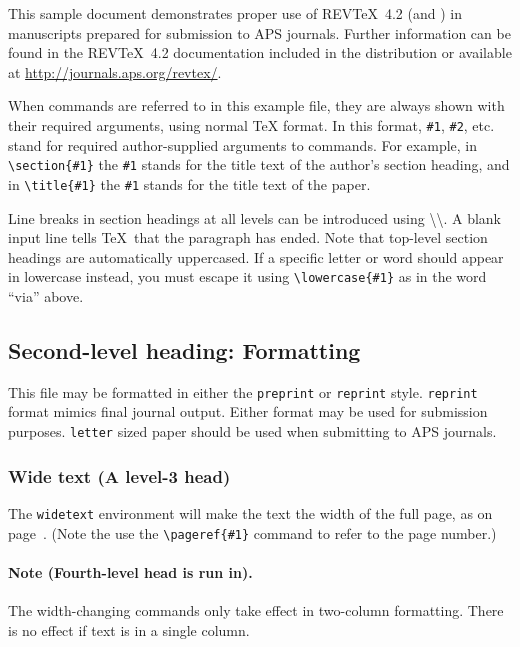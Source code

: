 \documentclass[%
 preprint, linenumbers,
 amsmath,amssymb,
 aps, physrev,
pra,
]{revtex4-2}
\begin{document}
This sample document demonstrates proper use of REV\TeX~4.2 (and
\LaTeXe) in manuscripts prepared for submission to APS
journals. Further information can be found in the REV\TeX~4.2
documentation included in the distribution or available at
\url{http://journals.aps.org/revtex/}.

When commands are referred to in this example file, they are always
shown with their required arguments, using normal \TeX{} format. In
this format, \verb+#1+, \verb+#2+, etc. stand for required
author-supplied arguments to commands. For example, in
\verb+\section{#1}+ the \verb+#1+ stands for the title text of the
author's section heading, and in \verb+\title{#1}+ the \verb+#1+
stands for the title text of the paper.

Line breaks in section headings at all levels can be introduced using
\textbackslash\textbackslash. A blank input line tells \TeX\ that the
paragraph has ended. Note that top-level section headings are
automatically uppercased. If a specific letter or word should appear in
lowercase instead, you must escape it using \verb+\lowercase{#1}+ as
in the word ``via'' above.

\subsection{\label{sec:level2}Second-level heading: Formatting}

This file may be formatted in either the \texttt{preprint} or
\texttt{reprint} style. \texttt{reprint} format mimics final journal output. 
Either format may be used for submission purposes. \texttt{letter} sized paper should
be used when submitting to APS journals.

\subsubsection{\textbf{Wide text (A level-3 head)}}
The \texttt{widetext} environment will make the text the width of the
full page, as on page~\pageref{eq:wideeq}. (Note the use the
\verb+\pageref{#1}+ command to refer to the page number.) 
\paragraph{Note (Fourth-level head is run in).}
The width-changing commands only take effect in two-column formatting. 
There is no effect if text is in a single column.
\end{document}
